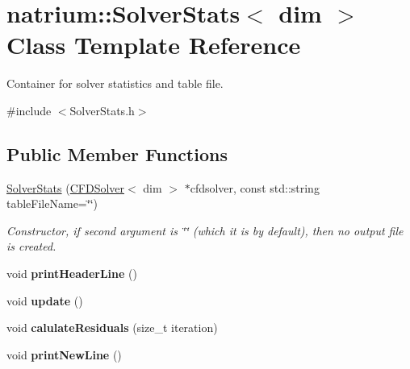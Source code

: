 \hypertarget{classnatrium_1_1SolverStats}{
\section{natrium::SolverStats$<$ dim $>$ Class Template Reference}
\label{classnatrium_1_1SolverStats}
}


Container for solver statistics and table file.  


{\ttfamily \#include $<$SolverStats.h$>$}\subsection*{Public Member Functions}
\begin{DoxyCompactItemize}
\item 
\hypertarget{classnatrium_1_1SolverStats_aaa0b74781be83337875982f0a46c67b8}{
\hyperlink{classnatrium_1_1SolverStats_aaa0b74781be83337875982f0a46c67b8}{SolverStats} (\hyperlink{classnatrium_1_1CFDSolver}{CFDSolver}$<$ dim $>$ $\ast$cfdsolver, const std::string tableFileName=\char`\"{}\char`\"{})}
\label{classnatrium_1_1SolverStats_aaa0b74781be83337875982f0a46c67b8}

\begin{DoxyCompactList}\small\item\em Constructor, if second argument is \char`\"{}\char`\"{} (which it is by default), then no output file is created. \item\end{DoxyCompactList}\item 
\hypertarget{classnatrium_1_1SolverStats_a32c66bc8d05fbd0144dc9023fd17d3a8}{
void {\bfseries printHeaderLine} ()}
\label{classnatrium_1_1SolverStats_a32c66bc8d05fbd0144dc9023fd17d3a8}

\item 
\hypertarget{classnatrium_1_1SolverStats_a15b90f4fa22d7881a0ab868f2e12680b}{
void {\bfseries update} ()}
\label{classnatrium_1_1SolverStats_a15b90f4fa22d7881a0ab868f2e12680b}

\item 
\hypertarget{classnatrium_1_1SolverStats_a0f980c759a166a697a7338baec559ee8}{
void {\bfseries calulateResiduals} (size\_\-t iteration)}
\label{classnatrium_1_1SolverStats_a0f980c759a166a697a7338baec559ee8}

\item 
\hypertarget{classnatrium_1_1SolverStats_a55101045c882c45fe3b46aa236d63604}{
void {\bfseries printNewLine} ()}
\label{classnatrium_1_1SolverStats_a55101045c882c45fe3b46aa236d63604}


\end{DoxyCompactItemize}
